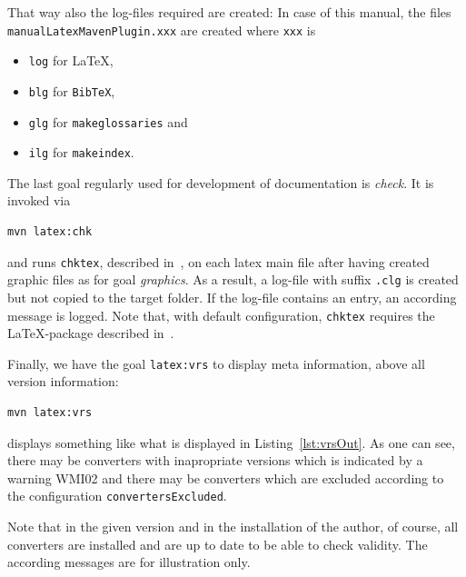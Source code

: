 \documentclass[12pt]{book}
\begin{document}

That way also the log-files required are created: 
In case of this manual, 
the files \texttt{manualLatexMavenPlugin.xxx} are created 
where \texttt{xxx} is 
%
\begin{itemize}
\item
\texttt{log} for \LaTeX, 
\item
\texttt{blg} for \texttt{BibTeX}, 
\item
\texttt{glg} for \texttt{makeglossaries} and 
\item
\texttt{ilg} for \texttt{makeindex}. 
\end{itemize}

The last goal regularly used for development of documentation is {\em check}. 
It is invoked via 
% 
\begin{Verbatim}
mvn latex:chk
\end{Verbatim}
%
and runs \texttt{chktex}, described in~\cite{ChkTeX}, 
on each latex main file 
after having created graphic files as for goal {\em graphics}. 
As a result, a log-file with suffix \texttt{.clg} is created 
but not copied to the target folder. 
If the log-file contains an entry, 
an according message is logged. 
Note that, with default configuration, 
\texttt{chktex} requires the \LaTeX-package  
described in~\cite{BooktP}. 


Finally, we have the goal \texttt{latex:vrs}
to display meta information, above all version information:
% 
\begin{Verbatim}
mvn latex:vrs
\end{Verbatim}
%
displays something like what is displayed in Listing~\ref{lst:vrsOut}.
As one can see, there may be converters with inapropriate versions
which is indicated by a warning WMI02 
and there may be converters which are excluded
according to the configuration \texttt{convertersExcluded}.

Note that in the given version and in the installation of the author,
of course, all converters are installed and are up to date
to be able to check validity.
The according messages are for illustration only. 
\end{document}
